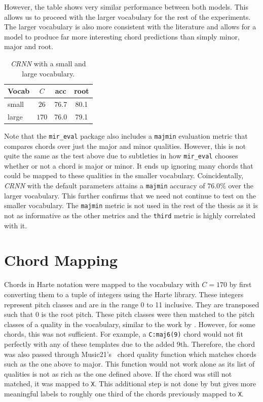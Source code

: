 However, the table shows very similar performance between both models. This allows us to proceed with the larger vocabulary for the rest of the experiments. The larger vocabulary is also more consistent with the literature and allows for a model to produce far more interesting chord predictions than simply minor, major and root. 

\begin{table}[H]
    \centering
    \begin{tabular}{lccc}
        \toprule
        Vocab & $C$ & acc & root \\  
        \midrule
        small & $26$ & 76.7 & 80.1 \\
        large & $170$ & 76.0 & 79.1 \\
        \bottomrule
    \end{tabular}
    \caption{\emph{CRNN} with a small and large vocabulary.}\label{tab:small_vs_large_vocab}
\end{table}

Note that the \texttt{mir\_eval} package also includes a \texttt{majmin} evaluation metric that compares chords over just the major and minor qualities. However, this is not quite the same as the test above due to subtleties in how \texttt{mir\_eval} chooses whether or not a chord is major or minor. It ends up ignoring many chords that could be mapped to these qualities in the smaller vocabulary. Coincidentally, \emph{CRNN} with the default parameters attains a \texttt{majmin} accuracy of $76.0\%$ over the larger vocabulary. This further confirms that we need not continue to test on the smaller vocabulary. The  \texttt{majmin} metric is not used in the rest of the thesis as it is not as informative as the other metrics and the \texttt{third} metric is highly correlated with it.

\section{Chord Mapping}\label{app:chord_mapping}

Chords in Harte notation were mapped to the vocabulary with $C=170$ by first converting them to a tuple of integers using the Harte library. These integers represent pitch classes and are in the range 0 to 11 inclusive. They are transposed such that 0 is the root pitch. These pitch classes were then matched to the pitch classes of a quality in the vocabulary, similar to the work by \citet{StructuredTraining}. However, for some chords, this was not sufficient. For example, a \texttt{C:maj6(9)} chord would not fit perfectly with any of these templates due to the added 9th. Therefore, the chord was also passed through Music21's~\citep{music21} chord quality function which matches chords such as the one above to major. This function would not work alone as its list of qualities is not as rich as the one defined above. If the chord was still not matched, it was mapped to \texttt{X}. This additional step is not done by \citet{StructuredTraining} but gives more meaningful labels to roughly one third of the chords previously mapped to \texttt{X}.

